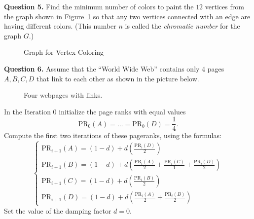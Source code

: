 \documentclass[jou]{apa6}
\begin{document}

\vspace{10pt}
{\bf Question 5.} Find the minimum number of colors to paint the $12$ vertices
from the graph shown in Figure~\ref{fig:graph-coloring} so
that any two vertices connected with an edge are having different colors. 
(This number $n$ is called the {\em chromatic number} for the graph $G$.)

\begin{figure}[!htb]
\caption{\label{fig:graph-coloring} Graph for Vertex Coloring}
\end{figure}




\vspace{10pt}
{\bf Question 6.} Assume that the ``World Wide Web'' contains only 
$4$ pages $A,B,C,D$ that link to each other as shown in the picture below.


\begin{figure}[!htb]
\caption{\label{fig:pageranks} Four webpages with links.}
\end{figure}



In the Iteration $0$ initialize the page ranks with equal values 
$$\text{PR}_0(A) = \ldots = \text{PR}_0(D) = \frac{1}{4}.$$ 
Compute the first two iterations of these pageranks, using the formulas: 
$$\left\{ \begin{array}{l}
\text{PR}_{i+1}(A) = (1 - d) + d\left( \frac{\text{PR}_i(D)}{2} \right)\\
\text{PR}_{i+1}(B) = (1 - d) + d\left( \frac{\text{PR}_i(A)}{2} + \frac{\text{PR}_i(C)}{1} + \frac{\text{PR}_i(D)}{2}  \right)\\
\text{PR}_{i+1}(C) = (1 - d) + d\left( \frac{\text{PR}_i(B)}{2} \right)\\
\text{PR}_{i+1}(D) = (1 - d) + d\left( \frac{\text{PR}_i(A)}{2} + \frac{\text{PR}_i(B)}{2} \right)
\end{array} \right.$$
Set the value of the damping factor $d=0$.
\end{document}

